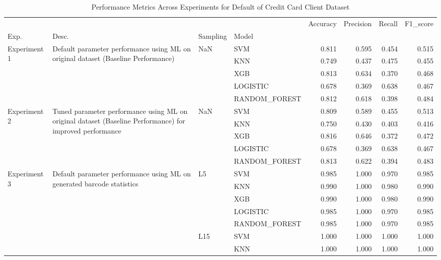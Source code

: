 \begin{table}
\caption{Performance Metrics Across Experiments for Default of Credit Card Client Dataset}
\label{tab:results for Default of Credit Card Client Dataset}
\begin{tabular}{llllrrrr}
\toprule
 &  &  &  & Accuracy & Precision & Recall & F1\_score \\
Exp. & Desc. & Sampling & Model &  &  &  &  \\
\midrule
\multirow[t]{5}{*}{Experiment 1} & \multirow[t]{5}{*}{Default parameter performance using ML on original dataset (Baseline Performance)} & \multirow[t]{5}{*}{NaN} & SVM & 0.811 & 0.595 & 0.454 & 0.515 \\
 &  &  & KNN & 0.749 & 0.437 & 0.475 & 0.455 \\
 &  &  & XGB & 0.813 & 0.634 & 0.370 & 0.468 \\
 &  &  & LOGISTIC & 0.678 & 0.369 & 0.638 & 0.467 \\
 &  &  & RANDOM\_FOREST & 0.812 & 0.618 & 0.398 & 0.484 \\
\cline{1-8} \cline{2-8} \cline{3-8}
\multirow[t]{5}{*}{Experiment 2} & \multirow[t]{5}{*}{Tuned parameter performance using ML on original dataset (Baseline Performance) for improved performance} & \multirow[t]{5}{*}{NaN} & SVM & 0.809 & 0.589 & 0.455 & 0.513 \\
 &  &  & KNN & 0.750 & 0.430 & 0.403 & 0.416 \\
 &  &  & XGB & 0.816 & 0.646 & 0.372 & 0.472 \\
 &  &  & LOGISTIC & 0.678 & 0.369 & 0.638 & 0.467 \\
 &  &  & RANDOM\_FOREST & 0.813 & 0.622 & 0.394 & 0.483 \\
\cline{1-8} \cline{2-8} \cline{3-8}
\multirow[t]{10}{*}{Experiment 3} & \multirow[t]{10}{*}{Default parameter performance using ML on generated barcode statistics} & \multirow[t]{5}{*}{L5} & SVM & 0.985 & 1.000 & 0.970 & 0.985 \\
 &  &  & KNN & 0.990 & 1.000 & 0.980 & 0.990 \\
 &  &  & XGB & 0.990 & 1.000 & 0.980 & 0.990 \\
 &  &  & LOGISTIC & 0.985 & 1.000 & 0.970 & 0.985 \\
 &  &  & RANDOM\_FOREST & 0.985 & 1.000 & 0.970 & 0.985 \\
\cline{3-8}
 &  & \multirow[t]{5}{*}{L15} & SVM & 1.000 & 1.000 & 1.000 & 1.000 \\
 &  &  & KNN & 1.000 & 1.000 & 1.000 & 1.000 \\

\end{tabular}
\end{table}
